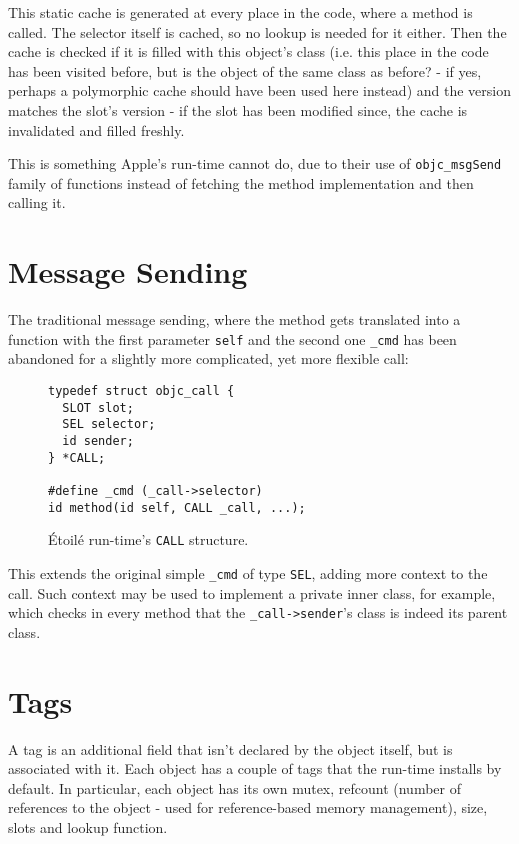 This static cache is generated at every place in the code, where a method is called. The selector itself is cached, so no lookup is needed for it either. Then the cache is checked if it is filled with this object's class (i.e. this place in the code has been visited before, but is the object of the same class as before? - if yes, perhaps a polymorphic cache should have been used here instead) and the version matches the slot's version - if the slot has been modified since, the cache is invalidated and filled freshly.

This is something Apple's run-time cannot do, due to their use of \verb=objc_msgSend= family of functions instead of fetching the method implementation and then calling it.

\section{Message Sending}

The traditional message sending, where the method gets translated into a function with the first parameter \verb=self= and the second one \verb=_cmd= has been abandoned for a slightly more complicated, yet more flexible call:

\begin{figure}[H]
\begin{verbatim}
typedef struct objc_call {
  SLOT slot;
  SEL selector;
  id sender;
} *CALL;

#define _cmd (_call->selector)
id method(id self, CALL _call, ...);
\end{verbatim}
  \centering{}
  \caption{\'Etoil\'e run-time's \texttt{CALL} structure.}
  \label{fig:etoile_CALL_struct}
\end{figure}

This extends the original simple \verb=_cmd= of type \verb=SEL=, adding more context to the call. Such context may be used to implement a private inner class, for example, which checks in every method that the \verb=_call->sender='s class is indeed its parent class.

\section{Tags}

A tag is an additional field that isn't declared by the object itself, but is associated with it. Each object has a couple of tags that the run-time installs by default. In particular, each object has its own mutex, refcount (number of references to the object - used for reference-based memory management), size, slots and lookup function.

